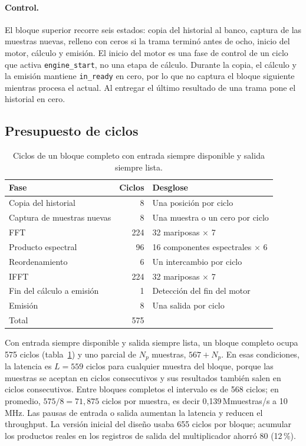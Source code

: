 \paragraph{Control.} El bloque superior recorre seis estados: copia del historial al banco, captura de las muestras nuevas, relleno con ceros si la trama terminó antes de ocho, inicio del motor, cálculo y emisión. El inicio del motor es una fase de control de un ciclo que activa \texttt{engine\_start}, no una etapa de cálculo. Durante la copia, el cálculo y la emisión mantiene \texttt{in\_ready} en cero, por lo que no captura el bloque siguiente mientras procesa el actual. Al entregar el último resultado de una trama pone el historial en cero.

\subsection{Presupuesto de ciclos}

\begin{table}[h]
  \centering
  \caption{Ciclos de un bloque completo con entrada siempre disponible y salida siempre lista.}\label{tab:frec-ciclos}
  \begin{tabular}{lrl}
    \toprule
    Fase & Ciclos & Desglose \\
    \midrule
    Copia del historial & 8 & Una posición por ciclo \\
    Captura de muestras nuevas & 8 & Una muestra o un cero por ciclo \\
    FFT & 224 & 32 mariposas $\times$ 7 \\
    Producto espectral & 96 & 16 componentes espectrales $\times$ 6 \\
    Reordenamiento & 6 & Un intercambio por ciclo \\
    IFFT & 224 & 32 mariposas $\times$ 7 \\
    Fin del cálculo a emisión & 1 & Detección del fin del motor \\
    Emisión & 8 & Una salida por ciclo \\
    \midrule
    Total & 575 & \\
    \bottomrule
  \end{tabular}
\end{table}

Con entrada siempre disponible y salida siempre lista, un bloque completo ocupa 575 ciclos (tabla~\ref{tab:frec-ciclos}) y uno parcial de $N_p$ muestras, $567 + N_p$. En esas condiciones, la latencia es $L = 559$ ciclos para cualquier muestra del bloque, porque las muestras se aceptan en ciclos consecutivos y sus resultados también salen en ciclos consecutivos. Entre bloques completos el intervalo es de 568 ciclos; en promedio, $575/8 = 71{,}875$ ciclos por muestra, es decir 0,139\,Mmuestras/s a 10\,MHz. Las pausas de entrada o salida aumentan la latencia y reducen el throughput. La versión inicial del diseño usaba 655 ciclos por bloque; acumular los productos reales en los registros de salida del multiplicador ahorró 80 (12\,\%).

